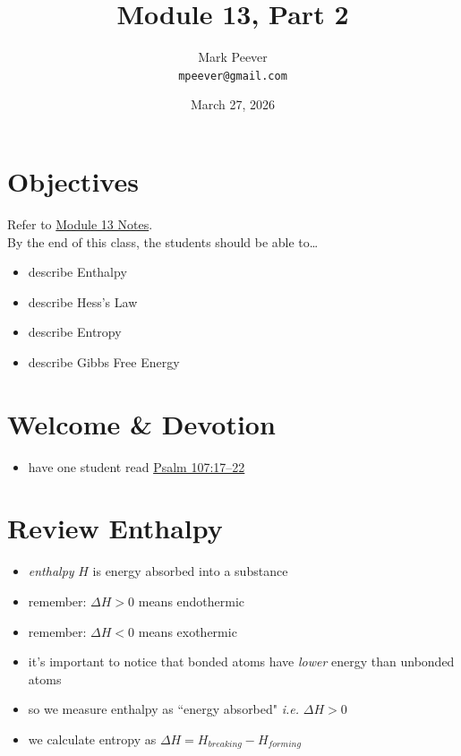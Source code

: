 \documentclass[10pt, oneside]{article}   	%
\title{Module 13, Part 2}
\author{Mark Peever\\ \texttt{mpeever@gmail.com}}
\date{March 27, 2026}
\begin{document}
\maketitle

\section*{Objectives}
Refer to \href{https://drive.google.com/file/d/1fjlyN9yBxzAyjC-e-0vPJIUG56TnYqO6/view?usp=sharing}{Module 13 Notes}.\\

By the end of this class, the students should be able to\ldots
\begin{itemize}
\item describe Enthalpy
\item describe Hess's Law
\item describe Entropy
\item describe Gibbs Free Energy
\end{itemize}

\section*{Welcome \& Devotion}
\begin{itemize}
\item have one student read \href{https://www.biblegateway.com/passage/?search=psalm\%20107\&version=LSB}{Psalm 107:17--22}
\end{itemize}


\section*{Review Enthalpy}

\begin{itemize}
\item \emph{enthalpy} $H$ is energy absorbed into a substance
\item remember: $\Delta H > 0$ means endothermic
\item remember: $\Delta H < 0$ means exothermic
\end{itemize}

\begin{itemize}
\item it's important to notice that bonded atoms have \emph{lower} energy than unbonded atoms
\item so we measure enthalpy as ``energy absorbed" \emph{i.e.} $\Delta H > 0$
\item we calculate entropy as $\Delta H = H_{breaking} - H_{forming}$
\end{itemize}
\end{document}
